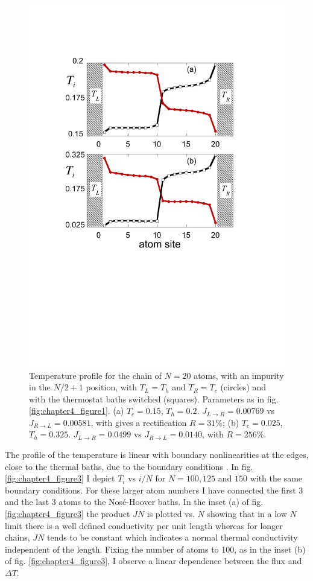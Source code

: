 \begin{figure}
\centering
\includegraphics[width=0.65\linewidth]{Figures/FIG4b.pdf}
\caption{Temperature profile for the chain of $N=20$ atoms, with an impurity in the $N/2+1$ position, with $T_L=T_h$ and $T_R=T_c$ (circles) and with the thermostat baths switched (squares).
Parameters as in fig. \ref{fig:chapter4_figure1}.
(a) $T_c=0.15$, $T_h=0.2$. $J_{L\rightarrow R}=0.00769$ vs $J_{R\rightarrow L}=0.00581$, with gives a rectification $R=31 \% $; (b) $T_c=0.025$, $T_h=0.325$. $J_{L\rightarrow R}=0.0499$ vs  $J_{R\rightarrow L}=0.0140$, with $R=256 \%$.}
\label{fig:chapter4_figure4}
\end{figure}

The profile of the temperature is linear with boundary nonlinearities at the edges, close to the thermal baths,  due to the boundary conditions \cite{Lepri1997}. In fig. \ref{fig:chapter4_figure3} I depict $T_i$ vs $i/N$ for $N=100, 125$ and $150$ with the same boundary conditions. For these
larger atom numbers  I have connected the first 3 and the last 3 atoms to the Nos\'e-Hoover baths.
In the inset (a) of fig. \ref{fig:chapter4_figure3}  the product $JN$ is plotted vs. $N$ showing that in a low $N$ limit there is a well defined conductivity per unit length whereas for longer chains, $JN$ tends to be constant  which indicates a normal thermal conductivity independent of the length. Fixing the number of atoms to 100, as in the inset (b) of fig. \ref{fig:chapter4_figure3},  I observe a linear dependence between the flux and $\Delta T$.

